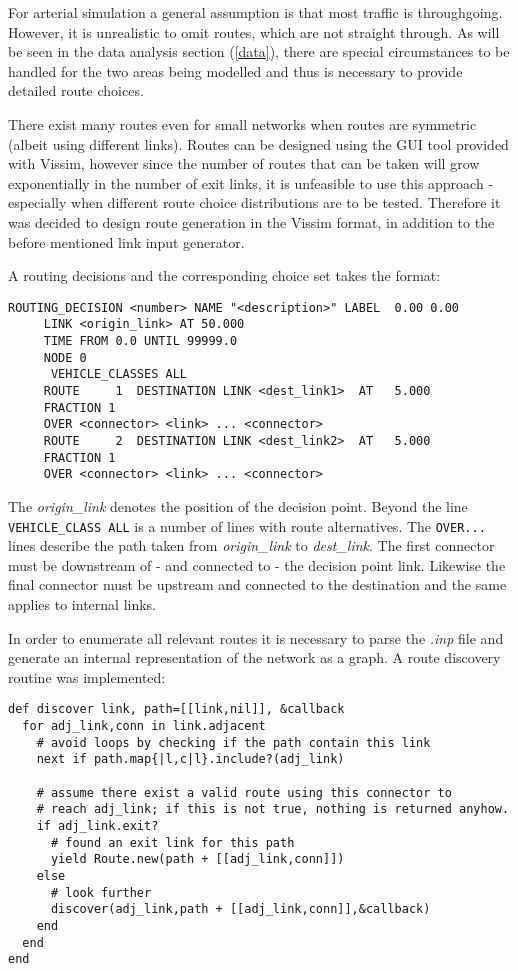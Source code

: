 For arterial simulation a general assumption is that most traffic is throughgoing. However, it is unrealistic to omit routes, which are not straight through. As will be seen in the data analysis section (\ref{data}), there are special circumstances to be handled for the two areas being modelled and thus is necessary to provide detailed route choices.

There exist many routes even for small networks when routes are symmetric (albeit using different links). Routes can be designed using the GUI tool provided with Vissim, however since the number of routes that can be taken will grow exponentially in the number of exit links, it is unfeasible to use this approach - especially when different route choice distributions are to be tested. Therefore it was decided to design route generation in the Vissim format, in addition to the before mentioned link input generator.

A routing decisions and the corresponding choice set takes the format:

\begin{verbatim}
ROUTING_DECISION <number> NAME "<description>" LABEL  0.00 0.00
     LINK <origin_link> AT 50.000
     TIME FROM 0.0 UNTIL 99999.0
     NODE 0
      VEHICLE_CLASSES ALL
     ROUTE     1  DESTINATION LINK <dest_link1>  AT   5.000
     FRACTION 1
     OVER <connector> <link> ... <connector>
     ROUTE     2  DESTINATION LINK <dest_link2>  AT   5.000
     FRACTION 1
     OVER <connector> <link> ... <connector>
\end{verbatim}

The \textit{origin\_link} denotes the position of the decision point. Beyond the line \verb|VEHICLE_CLASS ALL| is a number of lines with route alternatives. The \verb|OVER...| lines describe the path taken from \textit{origin\_link} to \textit{dest\_link}. The first connector must be downstream of - and connected to - the decision point link. Likewise the final connector must be upstream and connected to the destination and the same applies to internal links.

In order to enumerate all relevant routes it is necessary to parse the \textit{.inp} file and generate an internal representation of the network as a graph. A route discovery routine was implemented:

\begin{verbatim}
def discover link, path=[[link,nil]], &callback
  for adj_link,conn in link.adjacent
    # avoid loops by checking if the path contain this link
    next if path.map{|l,c|l}.include?(adj_link) 
    
    # assume there exist a valid route using this connector to 
    # reach adj_link; if this is not true, nothing is returned anyhow.
    if adj_link.exit?
      # found an exit link for this path
      yield Route.new(path + [[adj_link,conn]]) 
    else
      # look further
      discover(adj_link,path + [[adj_link,conn]],&callback)
    end
  end
end
\end{verbatim}